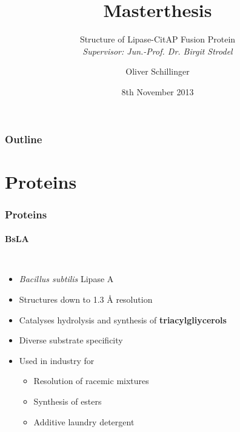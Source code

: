 \documentclass[english]{beamer}
\title[Masterthesis]{Masterthesis}
\subtitle[Structure]{Structure of Lipase-CitAP Fusion Protein\\
\textit{\small Supervisor: Jun.-Prof. Dr. Birgit Strodel}}
\author[o.schillinger@fz-juelich.de]{Oliver Schillinger}
\institute{ICS-6 | Multiscale Modelling Group}
\date{8th November 2013}
\begin{document}
\maketitle

\begin{frame}
    \frametitle{Outline}
    \tableofcontents
\end{frame}


\section{Proteins}


\begin{frame}
    \frametitle{Proteins}
    \framesubtitle{BsLA}

    \begin{columns}[t]
        \begin{itemize}
            \item \textit{Bacillus subtilis} Lipase A
            \item Structures down to 1.3 \r{A} resolution
            \item Catalyses hydrolysis and synthesis of \textbf{triacylgliycerols}
            \item Diverse substrate specificity
            \item Used in industry for
                \begin{itemize}
                    \item Resolution of racemic mixtures
                    \item Synthesis of esters
                    \item Additive laundry detergent
                \end{itemize}
        \end{itemize} 


\end{columns}
\end{frame}
\end{document}
